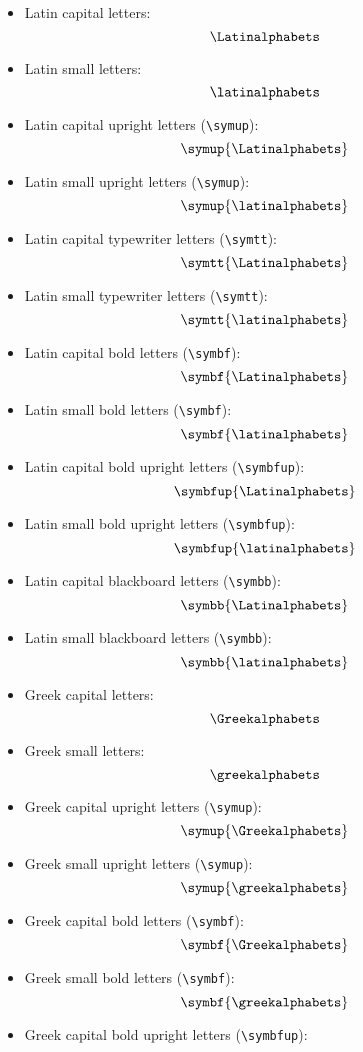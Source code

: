 \documentclass { article }
\begin{document}
\begin{itemize}
  \item Latin capital letters:
        \[ \Latinalphabets \]
  \item Latin small letters:
        \[ \latinalphabets \]
  \item Latin capital upright letters (\verb|\symup|):
        \[ \symup{\Latinalphabets} \]
  \item Latin small upright letters (\verb|\symup|):
        \[ \symup{\latinalphabets} \]
  \item Latin capital typewriter letters (\verb|\symtt|):
        \[ \symtt{\Latinalphabets} \]
  \item Latin small typewriter letters (\verb|\symtt|):
        \[ \symtt{\latinalphabets} \]
  \item Latin capital bold letters (\verb|\symbf|):
        \[ \symbf{\Latinalphabets} \]
  \item Latin small bold letters (\verb|\symbf|):
        \[ \symbf{\latinalphabets} \]
  \item Latin capital bold upright letters (\verb|\symbfup|):
        \[ \symbfup{\Latinalphabets} \]
  \item Latin small bold upright letters (\verb|\symbfup|):
        \[ \symbfup{\latinalphabets} \]
  \item Latin capital blackboard letters (\verb|\symbb|):
        \[ \symbb{\Latinalphabets} \]
  \item Latin small blackboard letters (\verb|\symbb|):
        \[ \symbb{\latinalphabets} \]
  \item Greek capital letters:
        \[ \Greekalphabets \]
  \item Greek small letters:
        \[ \greekalphabets \]
  \item Greek capital upright letters (\verb|\symup|):
        \[ \symup{\Greekalphabets} \]
  \item Greek small upright letters (\verb|\symup|):
        \[ \symup{\greekalphabets} \]
  \item Greek capital bold letters (\verb|\symbf|):
        \[ \symbf{\Greekalphabets} \]
  \item Greek small bold letters (\verb|\symbf|):
        \[ \symbf{\greekalphabets} \]
  \item Greek capital bold upright letters (\verb|\symbfup|):

\end{itemize}
\end{document}
